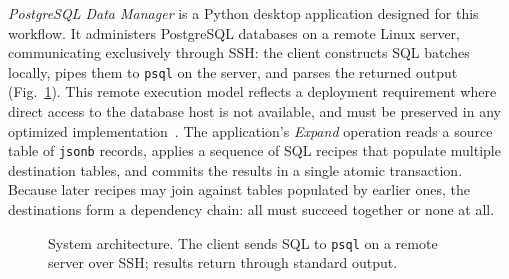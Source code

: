 \documentclass[journal]{IEEEtran}
\begin{document}
\emph{PostgreSQL Data Manager} is a Python desktop application designed for this workflow.
It administers PostgreSQL databases on a remote Linux server, communicating exclusively through SSH: the client constructs SQL batches locally, pipes them to \texttt{psql} on the server, and parses the returned output (Fig.~\ref{fig:architecture}).
This remote execution model reflects a deployment requirement where direct access to the database host is not available, and must be preserved in any optimized implementation~\cite{grimm2026}.
The application's \emph{Expand} operation reads a source table of \texttt{jsonb} records, applies a sequence of SQL recipes that populate multiple destination tables, and commits the results in a single atomic transaction.
Because later recipes may join against tables populated by earlier ones, the destinations form a dependency chain: all must succeed together or none at all.

\begin{figure}[!ht]
\centering
{}
\caption{System architecture. The client sends SQL to \texttt{psql} on a remote server over SSH; results return through standard output.}
\label{fig:architecture}
\end{figure}
\end{document}
